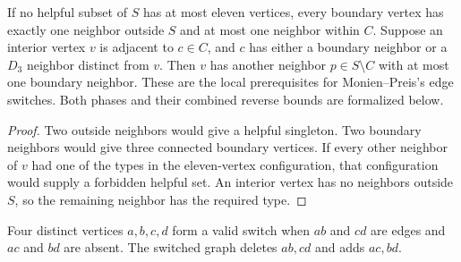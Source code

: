 \begin{theorem}
  \label{thm:lowerbounds-algebraic-switch-neighbor}
  \leanok
  If no helpful subset of $S$ has at most eleven vertices, every boundary
  vertex has exactly one neighbor outside $S$ and at most one neighbor
  within $C$. Suppose an interior vertex $v$ is adjacent to $c\in C$,
  and $c$ has either a boundary neighbor or a $D_3$ neighbor distinct
  from $v$. Then $v$ has another neighbor $p\in S\setminus C$ with at
  most one boundary neighbor.
  These are the local prerequisites for Monien--Preis's edge switches.
  Both phases and their combined reverse bounds are formalized below.
\end{theorem}
\begin{proof}
  \leanok
  Two outside neighbors would give a helpful singleton. Two boundary
  neighbors would give three connected boundary vertices. If every other
  neighbor of $v$ had one of the types in the eleven-vertex configuration,
  that configuration would supply a forbidden helpful set. An interior
  vertex has no neighbors outside $S$, so the remaining neighbor has
  the required type.
\end{proof}

\begin{definition}
  \label{def:lowerbounds-algebraic-edge-switch}
  \leanok
  Four distinct vertices $a,b,c,d$ form a valid switch when $ab$ and
  $cd$ are edges and $ac$ and $bd$ are absent. The switched graph
  deletes $ab,cd$ and adds $ac,bd$.
\end{definition}


